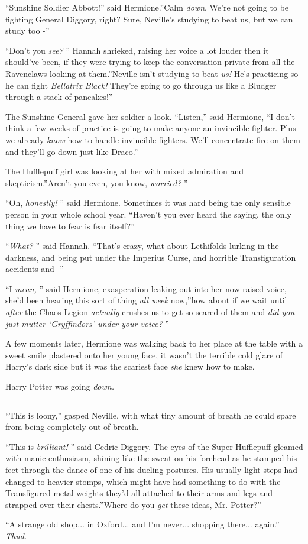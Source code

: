 ``Sunshine Soldier Abbott!'' said Hermione.''Calm \emph{down}. We're not
going to be fighting General Diggory, right? Sure, Neville's studying to
beat us, but we can study too -''

``Don't you \emph{see?} '' Hannah shrieked, raising her voice a lot louder
then it should've been, if they were trying to keep the conversation
private from all the Ravenclaws looking at them.''Neville isn't studying
to beat \emph{us!} He's practicing so he can fight \emph{Bellatrix
Black!} They're going to go through us like a Bludger through a stack of
pancakes!''

The Sunshine General gave her soldier a look. ``Listen,'' said Hermione,
``I don't think a few weeks of practice is going to make anyone an
invincible fighter. Plus we already \emph{know} how to handle invincible
fighters. We'll concentrate fire on them and they'll go down just like
Draco.''

The Hufflepuff girl was looking at her with mixed admiration and
skepticism.''Aren't you even, you know, \emph{worried?} ''

``Oh, \emph{honestly!} '' said Hermione. Sometimes it was hard being the
only sensible person in your whole school year. ``Haven't you ever heard
the saying, the only thing we have to fear is fear itself?''

``\emph{What?} '' said Hannah. ``That's crazy, what about Lethifolds
lurking in the darkness, and being put under the Imperius Curse, and
horrible Transfiguration accidents and -''

``I \emph{mean,} '' said Hermione, exasperation leaking out into her
now-raised voice, she'd been hearing this sort of thing \emph{all week}
now,''how about if we wait until \emph{after} the Chaos Legion
\emph{actually} crushes us to get so scared of them and \emph{did you
just mutter `Gryffindors' under your voice?} ''

A few moments later, Hermione was walking back to her place at the table
with a sweet smile plastered onto her young face, it wasn't the terrible
cold glare of Harry's dark side but it was the scariest face \emph{she}
knew how to make.

Harry Potter was going \emph{down.}

\begin{center}\rule{3in}{0.4pt}\end{center}

``This is loony,'' gasped Neville, with what tiny amount of breath he
could spare from being completely out of breath.

``This is \emph{brilliant!} '' said Cedric Diggory. The eyes of the Super
Hufflepuff gleamed with manic enthusiasm, shining like the sweat on his
forehead as he stamped his feet through the dance of one of his dueling
postures. His usually-light steps had changed to heavier stomps, which
might have had something to do with the Transfigured metal weights
they'd all attached to their arms and legs and strapped over their
chests.''Where do you \emph{get} these ideas, Mr. Potter?''

``A strange old shop... in Oxford... and I'm never...
shopping there... again.'' \emph{Thud.}
